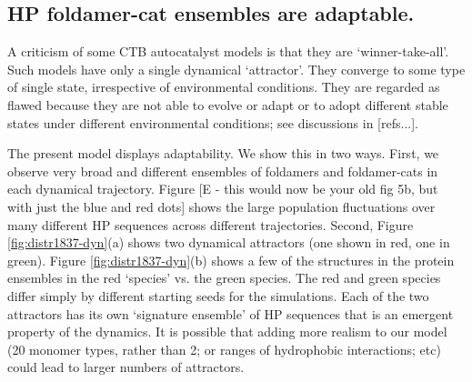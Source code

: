 \documentclass[5p,times]{elsarticle}
\begin{document}
\subsection{HP foldamer-cat ensembles are adaptable.}

 A criticism of some CTB autocatalyst models is that they are `winner-take-all'.  Such models have 
only a single dynamical `attractor'.  They converge to some type of single state, irrespective of 
environmental conditions.  They are regarded as flawed because they are not able to evolve or adapt 
or to adopt different stable states under different environmental conditions; see discussions in 
[refs...].
 
 The present model displays adaptability.  We show this in two ways.  First, we observe very broad 
and different ensembles of foldamers and foldamer-cats in each dynamical trajectory.  Figure [E - 
this would now be your old fig 5b, but with just the blue and red dots] shows the large population 
fluctuations over many different HP sequences across different trajectories.  Second, Figure 
\ref{fig:distr1837-dyn}(a) shows two dynamical attractors (one shown in red, one in green).  Figure 
\ref{fig:distr1837-dyn}(b) shows a few of the structures in the protein ensembles in the red 
`species' vs. the green species.  The red and green species differ simply by different starting 
seeds for the simulations.  Each of the two attractors has its own `signature ensemble' of HP 
sequences that is an emergent property of the dynamics.  It is possible that adding more realism to 
our model (20 monomer types, rather than 2; or ranges of hydrophobic interactions; etc) could lead 
to larger numbers of attractors.
 
\end{document}
